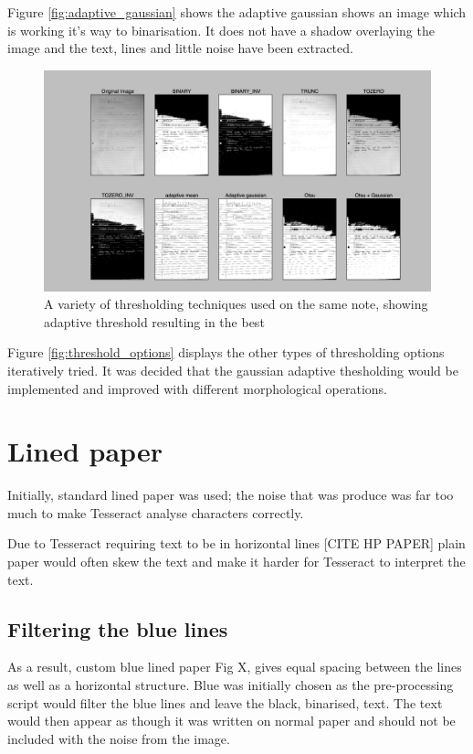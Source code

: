 Figure \ref{fig:adaptive_gaussian} shows the adaptive gaussian shows an image which is working it's way to binarisation. It does not have a shadow overlaying the image and the text, lines and little noise have been extracted.

\begin{figure}[H]
  \centering
  \includegraphics{images/thresholding_options}
  \caption{A variety of thresholding techniques used on the same note, showing adaptive threshold resulting in the best}
  \label{fig:thresholding_options}
\end{figure}

Figure \ref{fig:threshold_options} displays the other types of thresholding options iteratively tried. It was decided that the gaussian adaptive thesholding would be implemented and improved with different morphological operations.

\section{Lined paper}
Initially, standard lined paper was used; the noise that was produce was far too much to make Tesseract analyse characters correctly.

Due to Tesseract requiring text to be in horizontal lines [CITE HP PAPER] plain paper would often skew the text and make it harder for Tesseract to interpret the text.
\subsection{Filtering the blue lines}
As a result, custom blue lined paper Fig X, gives equal spacing between the lines as well as a horizontal structure. Blue was initially chosen as the pre-processing script would filter the blue lines and leave the black, binarised, text. The text would then appear as though it was written on normal paper and should not be included with the noise from the image.

